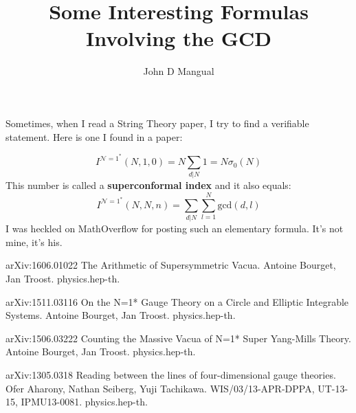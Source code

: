 \documentclass[12pt]{article}
\title{\textbf{ Some Interesting Formulas Involving the GCD }}
\author{John D Mangual}
\date{}
\begin{document}
\selectfont \fontsize{25}{30}\selectfont

\maketitle

Sometimes, when I read a String Theory paper, I try to find a verifiable statement.  Here is one I found in a paper:

$$ I^{\mathcal{N}=1^\ast}(N,1,0) = N \sum_{d| N} 1 = N \sigma_0(N) $$
This number is called a \textbf{superconformal index} and it also equals: 
$$ I^{\mathcal{N}=1^\ast}(N,N,n) =  \sum_{d| N} \sum_{l=1}^N \mathrm{gcd}(d,l ) $$
I was heckled on MathOverflow for posting such an elementary formula.  It's not mine, it's his.
\newpage

\selectfont \fontsize{12}{10}\selectfont

\begin{thebibliography}{}

\item arXiv:1606.01022 The Arithmetic of Supersymmetric Vacua. Antoine Bourget, Jan Troost. physics.hep-th.



\item arXiv:1511.03116 On the N=1* Gauge Theory on a Circle and Elliptic Integrable Systems. Antoine Bourget, Jan Troost. physics.hep-th.


\item arXiv:1506.03222 Counting the Massive Vacua of N=1* Super Yang-Mills Theory. Antoine Bourget, Jan Troost. physics.hep-th.

\item arXiv:1305.0318 Reading between the lines of four-dimensional gauge theories. Ofer Aharony, Nathan Seiberg, Yuji Tachikawa. WIS/03/13-APR-DPPA, UT-13-15, IPMU13-0081. physics.hep-th.



\end{thebibliography}
\end{document}
